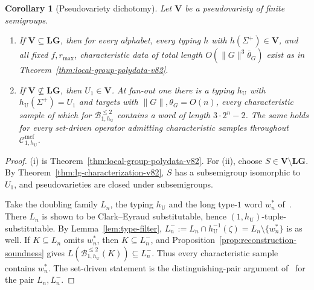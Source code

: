 \documentclass[11pt]{article}
\numberwithin{equation}{section}
\theoremstyle{plain}
\newtheorem{corollary}[theorem]{Corollary}
\theoremstyle{definition}
\theoremstyle{remark}
\newcommand{\Cmcf}[2]{\mathcal{C}^{\mathrm{mcf}}_{#1,#2}}
\theoremstyle{plain}
\begin{document}
\begin{corollary}[Pseudovariety dichotomy]
\label{cor:pseudovariety-dichotomy}
Let $\mathbf V$ be a pseudovariety of finite semigroups.
\begin{enumerate}[label=\textup{(\roman*)},leftmargin=*]
\item If $\mathbf V\subseteq\mathbf{LG}$, then for every alphabet,
every typing $h$ with $h(\Sigma^+)\in\mathbf V$, and all fixed
$f,r_{\max}$, characteristic data of total length
$O(\|G\|^3\bar\theta_G)$ exist as in
Theorem~\ref{thm:local-group-polydata-v82}.
\item If $\mathbf V\not\subseteq\mathbf{LG}$, then
$U_1\in\mathbf V$.  At fan-out one there is a typing $h_{\mathrm U}$ with
$h_{\mathrm U}(\Sigma^+)=U_1$ and targets with $\|G\|,\theta_G=O(n)$,
every characteristic sample of which for
$\mathcal B^{\le2}_{1,h_{\mathrm U}}$ contains a word of length
$3\cdot2^n-2$.  The same holds for every set-driven operator admitting
characteristic samples throughout $\Cmcf{1}{h_{\mathrm U}}$.
\end{enumerate}
\end{corollary}

\begin{proof}
(i) is Theorem~\ref{thm:local-group-polydata-v82}.  For (ii), choose
$S\in\mathbf V\setminus\mathbf{LG}$.  By
Theorem~\ref{thm:lg-characterization-v82}, $S$ has a subsemigroup isomorphic
to $U_1$, and pseudovarieties are closed under subsemigroups.

Take the doubling family $L_n$, the typing $h_{\mathrm U}$ and the long
type-$1$ word $w_n^*$ of~\cite[Proposition~6.3]{kuriyamaCFG}.  There
$L_n$ is shown to be Clark--Eyraud substitutable, hence
$(1,h_{\mathrm U})$-tuple-substitutable.  By
Lemma~\ref{lem:type-filter},
$L_n^-:=L_n\cap h_{\mathrm U}^{-1}(\zeta)=L_n\setminus\{w_n^*\}$ is as
well.  If $K\subseteq L_n$ omits $w_n^*$, then $K\subseteq L_n^-$, and
Proposition~\ref{prop:reconstruction-soundness} gives
$L(\mathcal B^{\le2}_{1,h_{\mathrm U}}(K))\subseteq L_n^-$.  Thus every
characteristic sample contains $w_n^*$.  The set-driven statement is
the distinguishing-pair argument of~\cite[Proposition~6.3(iv)]{kuriyamaCFG} for the pair
$L_n,L_n^-$.
\end{proof}
\end{document}
